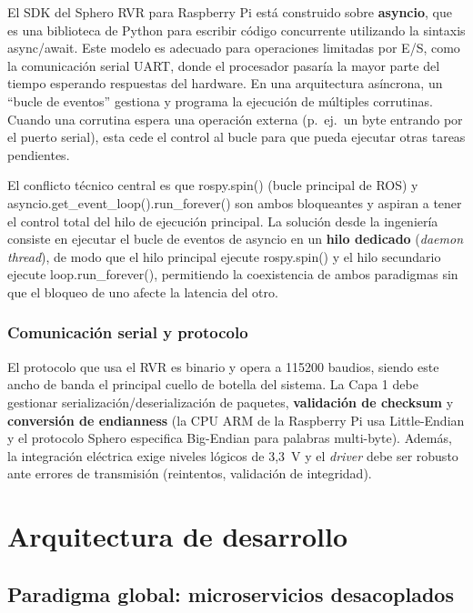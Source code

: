\documentclass[12pt]{article}
\numberwithin{figure}{section}
\numberwithin{table}{section}
\def\code#1{#1}%
\newcommand{\code}[1]{\textcolor{codeblue}{\url{#1}}}
\begin{document}
El SDK del Sphero RVR para Raspberry Pi está construido sobre \textbf{asyncio}, que es una biblioteca de Python para escribir código concurrente utilizando la sintaxis \code{async/await}. Este modelo es adecuado para operaciones limitadas por E/S, como la comunicación serial UART, donde el procesador pasaría la mayor parte del tiempo esperando respuestas del hardware. En una arquitectura asíncrona, un ``bucle de eventos'' gestiona y programa la ejecución de múltiples corrutinas. Cuando una corrutina espera una operación externa (p.\ ej.\ un byte entrando por el puerto serial), esta cede el control al bucle para que pueda ejecutar otras tareas pendientes.

El conflicto técnico central es que \code{rospy.spin()} (bucle principal de ROS) y \code{asyncio.get\_event\_loop().run\_forever()} son ambos bloqueantes y aspiran a tener el control total del hilo de ejecución principal. La solución desde la ingeniería consiste en ejecutar el bucle de eventos de asyncio en un \textbf{hilo dedicado} (\textit{daemon thread}), de modo que el hilo principal ejecute \code{rospy.spin()} y el hilo secundario ejecute \code{loop.run\_forever()}, permitiendo la coexistencia de ambos paradigmas sin que el bloqueo de uno afecte la latencia del otro.


\subsubsection{Comunicación serial y protocolo}

El protocolo que usa el RVR es binario y opera a 115200 baudios, siendo este ancho de banda el principal cuello de botella del sistema. La Capa 1 debe gestionar serialización/deserialización de paquetes, \textbf{validación de checksum} y \textbf{conversión de endianness} (la CPU ARM de la Raspberry Pi usa Little-Endian y el protocolo Sphero especifica Big-Endian para palabras multi-byte). Además, la integración eléctrica exige niveles lógicos de 3,3~V y el \textit{driver} debe ser robusto ante errores de transmisión (reintentos, validación de integridad).


\section{Arquitectura de desarrollo}
\label{sec:arquitectura_desarrollo}

\subsection{Paradigma global: microservicios desacoplados}
\end{document}
